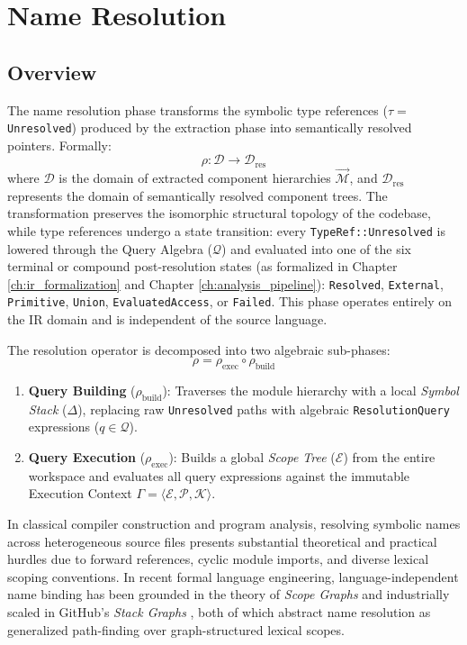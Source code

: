 \chapter{Name Resolution}
\label{ch:name_resolution}

\section{Overview}
\label{sec:resolution_overview}

The name resolution phase transforms the symbolic type references
($\tau =$ \texttt{Un}\-\texttt{re}\-\texttt{solved}) produced by the
extraction phase into
semantically resolved pointers. Formally:
$$\rho : \mathcal{D} \to \mathcal{D}_{\text{res}}$$
where $\mathcal{D}$ is the domain of extracted component hierarchies
$\vec{\mathcal{M}}$,
and $\mathcal{D}_{\text{res}}$ represents the domain of semantically
resolved component
trees. The transformation preserves the isomorphic structural
topology of the codebase,
while type references undergo a state transition: every
\texttt{TypeRef::Unresolved} is
lowered through the Query Algebra ($\mathcal{Q}$) and evaluated into
one of the six
terminal or compound post-resolution states (as formalized in Chapter
  \ref{ch:ir_formalization}
and Chapter \ref{ch:analysis_pipeline}): \texttt{Resolved}, \texttt{External},
\texttt{Primitive}, \texttt{Union}, \texttt{EvaluatedAccess}, or
\texttt{Failed}.
This phase operates entirely on the IR domain and is independent of
the source language.

The resolution operator is decomposed into two algebraic sub-phases:
$$\rho = \rho_{\text{exec}} \circ \rho_{\text{build}}$$
\begin{enumerate}
  \item \textbf{Query Building} ($\rho_{\text{build}}$): Traverses the module
    hierarchy with a local \textit{Symbol Stack} ($\Delta$), replacing
    raw \texttt{Unresolved} paths with algebraic
    \texttt{ResolutionQuery} expressions ($q \in \mathcal{Q}$).
  \item \textbf{Query Execution} ($\rho_{\text{exec}}$): Builds a global
    \textit{Scope Tree} ($\mathcal{E}$) from the entire workspace and
    evaluates all query expressions against the immutable Execution Context
    $\Gamma = \langle \mathcal{E}, \mathcal{P}, \mathcal{K} \rangle$.
\end{enumerate}

In classical compiler construction and program analysis, resolving
symbolic names across
heterogeneous source files presents substantial theoretical and
practical hurdles due to forward
references, cyclic module imports, and diverse lexical scoping
conventions. In recent formal
language engineering, language-independent name binding has been
grounded in the theory of
\textit{Scope Graphs} \cite{zwaan_scope_2023} and industrially scaled
in GitHub's \textit{Stack Graphs}
\cite{creager_stack_2023}, both of which abstract name resolution as
generalized path-finding
over graph-structured lexical scopes.

